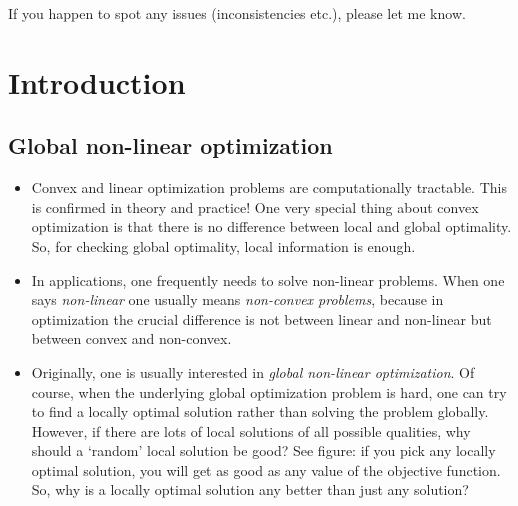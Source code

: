 If you happen to spot any issues (inconsistencies etc.), please let me know. 

\clearpage 

\section{Introduction}



\subsection{Global non-linear optimization} 

\begin{itemize}
	\item Convex and linear optimization problems are computationally tractable. This is confirmed in theory and practice! One very special thing about convex optimization is that there is no difference between local and global optimality. So, for checking global optimality, local information is enough.
	\item In applications, one frequently needs to solve non-linear problems. When one says \emph{non-linear} one usually means \emph{non-convex problems}, because in optimization the crucial difference is not between linear and non-linear but between convex and non-convex.
	\item Originally, one is usually interested in \emph{global non-linear optimization}. Of course, when the underlying global optimization problem is hard, one can try to find a locally optimal solution rather than solving the problem globally. However, if there are lots of local solutions of all possible qualities, why should a `random' local solution be good?  See figure: if you pick any locally optimal solution, you will get as good as any value of the objective function. So, why is a locally optimal solution any better than just any solution?
	\begin{center}
	\end{center}

\end{itemize}
